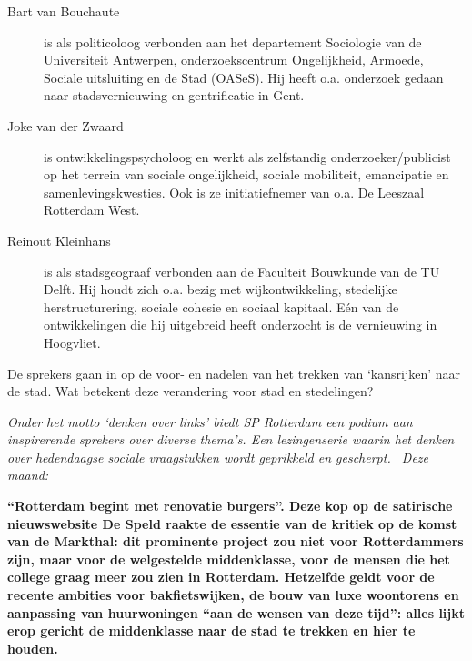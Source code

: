 \documentclass[12pt]{article}
\begin{document}

\vfill
{}
\vfill

\begin{description}
\item[Bart van Bouchaute] is als politicoloog verbonden aan het departement Sociologie
van de Universiteit Antwerpen, onderzoekscentrum Ongelijkheid, Armoede, Sociale
uitsluiting en de Stad (OASeS). Hij heeft o.a. onderzoek gedaan naar
stadsvernieuwing en gentrificatie in Gent.
\item[Joke van der Zwaard] is ontwikkelingspsycholoog en werkt als zelfstandig
onderzoeker/publicist op het terrein van sociale ongelijkheid, sociale
mobiliteit, emancipatie en samenlevingskwesties. Ook is ze initiatiefnemer van
o.a. De Leeszaal Rotterdam West.
\item[Reinout Kleinhans] is als stadsgeograaf verbonden aan de Faculteit Bouwkunde van
de TU Delft. Hij houdt zich o.a. bezig met wijkontwikkeling, stedelijke
herstructurering, sociale cohesie en sociaal kapitaal. E\'en van de
ontwikkelingen die hij uitgebreid heeft onderzocht is de vernieuwing in
Hoogvliet.
\end{description}

\vfill

De sprekers gaan in op de voor- en nadelen van het trekken van `kansrijken'
naar de stad. Wat betekent deze
verandering voor stad en stedelingen?

\DolFooterLarge

\newpage

\emph{Onder het motto `denken over links' biedt SP Rotterdam een podium aan
inspirerende sprekers over diverse thema's. Een lezingenserie waarin het denken
over hedendaagse sociale vraagstukken wordt geprikkeld en gescherpt. \ Deze
maand:}

\vfill

\DolMega{\textcolor{DolRed}{Stad zoekt Middenklasse}}

\vfill

\textbf{``Rotterdam begint met renovatie burgers''. Deze kop op de satirische
nieuwswebsite De Speld raakte de essentie van de kritiek op de komst van de
Markthal: dit prominente project zou niet voor Rotterdammers zijn, maar voor de
welgestelde middenklasse, voor de mensen die het college graag meer zou zien in
Rotterdam. Hetzelfde geldt voor de recente ambities voor bakfietswijken, de
bouw van luxe woontorens en aanpassing van huurwoningen ``aan de wensen van
deze tijd'': alles lijkt erop gericht de middenklasse naar de stad te trekken
en hier te houden.}
\end{document}
